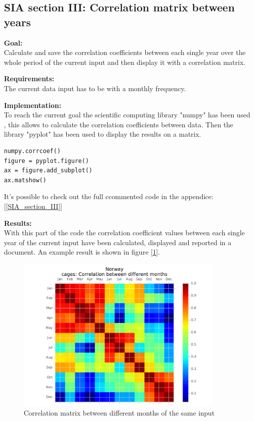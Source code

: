 \newpage
\subsection{SIA section III: Correlation matrix between years}

\textbf{Goal:}\\
Calculate and save the correlation coefficients between each single year over the whole period of the current input and then display it with a correlation matrix.

\textbf{Requirements:}\\
The current data input has to be with a monthly frequency. 

\textbf{Implementation:}\\
To reach the current goal the scientific computing library "numpy" has been used , this allows to calculate the correlation coefficients between data. Then the library "pyplot" has been used to display the results on a matrix.
\begin{lstlisting}
numpy.corrcoef()
figure = pyplot.figure()
ax = figure.add_subplot()
ax.matshow()
\end{lstlisting}

It's possible to check out the full ccommented code in the appendice: [\ref{SIA_section_III}]

\textbf{Results:} \\
With this part of the code the correlation coefficient values between each single year of the current input have been calculated, displayed and reported in a document. An example result is shown in figure [\ref{Corr_Months}].
\begin{figure}[H]
	\centering
    \includegraphics[trim={0 0.3cm 0 0.3cm},clip,width=0.9\textwidth]{Files/Cages_Months_Matrix.pdf}
    \caption{Correlation matrix between different months of the same input}
    \label{Corr_Months}
\end{figure}





